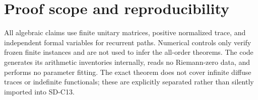\section{Proof scope and reproducibility}

All algebraic claims use finite unitary matrices, positive normalized trace,
and independent formal variables for recurrent paths.  Numerical controls
only verify frozen finite instances and are not used to infer the all-order
theorems.  The code generates its arithmetic inventories internally, reads no
Riemann-zero data, and performs no parameter fitting.  The exact theorem does
not cover infinite diffuse traces or indefinite functionals; these are
explicitly separated rather than silently imported into SD-C13.
